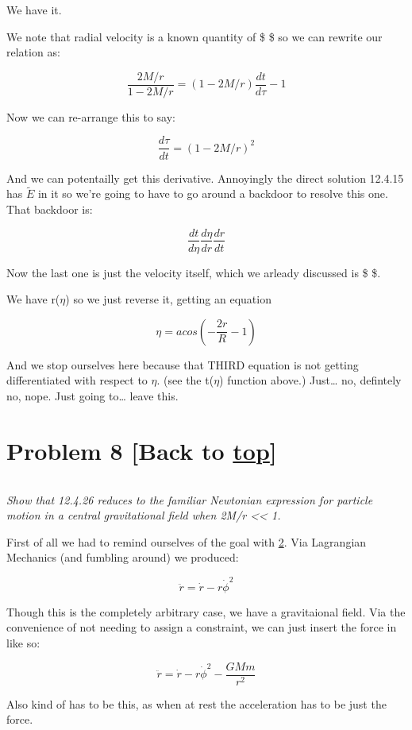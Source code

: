 \documentclass[landscape,letterpaper,10pt,english]{article}
\begin{document}
We have it.

    We note that radial velocity is a known quantity of \$  \$
so we can rewrite our relation as:

\[\frac{2M/r}{1-2M/r} = (1-2M/r)\frac{dt}{d\tau} - 1\]

Now we can re-arrange this to say:

\[ \frac{d\tau}{dt} = \left( 1 - 2M/r \right)^2  \]

And we can potentailly get this derivative. Annoyingly the direct
solution 12.4.15 has \(\tilde E\) in it so we're going to have to go
around a backdoor to resolve this one. That backdoor is:

\[ \frac{dt}{d\eta}\frac{d\eta}{dr}\frac{dr}{dt} \]

Now the last one is just the velocity itself, which we arleady discussed
is \$  \$.

We have r(\(\eta\)) so we just reverse it, getting an equation

\[ \eta = acos\left( -\frac{2r}{R}-1 \right) \]

    And we stop ourselves here because that THIRD equation is not getting
differentiated with respect to \(\eta\). (see the t(\(\eta\)) function
above.) Just\ldots{} no, defintely no, nope. Just going to\ldots{} leave
this.

    \hypertarget{problem-8-back-to-top}{%
\section{\texorpdfstring{Problem 8 {[}Back to
\hyperref[toc]{top}{]}}{Problem 8 {[}Back to {]}}}\label{problem-8-back-to-top}}

\[\label{P8}\]

\emph{Show that 12.4.26 reduces to the familiar Newtonian expression for
particle motion in a central gravitational field when 2M/r
\textless\textless{} 1.}

First of all we had to remind ourselves of the goal with
\hyperref[2]{2}. Via Lagrangian Mechanics (and fumbling around) we
produced:

\[ \ddot r = \dot r - r \dot \phi^2 \]

Though this is the completely arbitrary case, we have a gravitaional
field. Via the convenience of not needing to assign a constraint, we can
just insert the force in like so:

\[ \ddot r = \dot r - r \dot \phi^2 - \frac{GMm}{r^2} \]

Also kind of has to be this, as when at rest the acceleration has to be
just the force.
\end{document}
